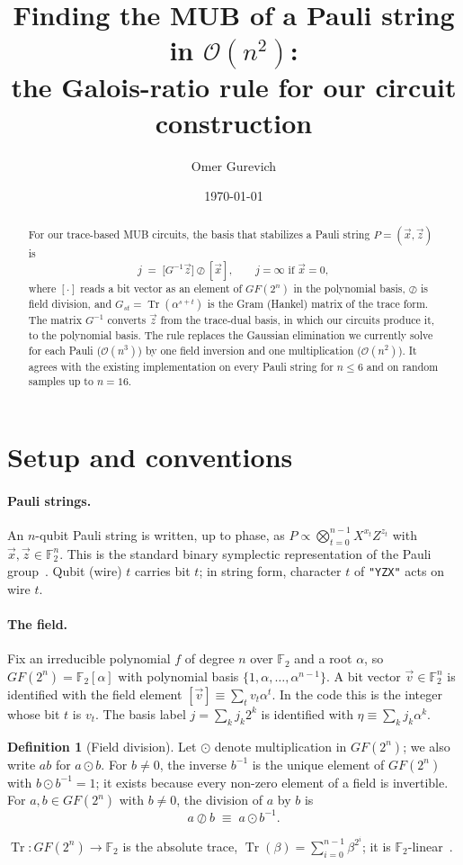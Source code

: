 \documentclass[11pt]{article}
\title{Finding the MUB of a Pauli string in $\mathcal{O}(n^2)$:\\ the Galois-ratio rule for our circuit construction}
\author{Omer Gurevich}
\date{\today}
\theoremstyle{definition}
\newtheorem{definition}{Definition}
\theoremstyle{remark}
\newcommand{\F}{\mathbb{F}}
\newcommand{\Tr}{\operatorname{Tr}}
\newcommand{\vx}{\vec{x}}
\newcommand{\vz}{\vec{z}}
\begin{document}
\maketitle

\begin{abstract}
For our trace-based MUB circuits, the basis that stabilizes a Pauli string $P=(\vx,\vz)$ is
\[
  j \;=\; \bigl[G^{-1}\vz\bigr]\oslash[\vx], \qquad j=\infty \text{ if } \vx=0,
\]
where $[\cdot]$ reads a bit vector as an element of $GF(2^n)$ in the polynomial basis, $\oslash$ is field division, and $G_{st}=\Tr(\alpha^{s+t})$ is the Gram (Hankel) matrix of the trace form.
The matrix $G^{-1}$ converts $\vz$ from the trace-dual basis, in which our circuits produce it, to the polynomial basis.
The rule replaces the Gaussian elimination we currently solve for each Pauli ($\mathcal{O}(n^3)$) by one field inversion and one multiplication ($\mathcal{O}(n^2)$).
It agrees with the existing implementation on every Pauli string for $n\le 6$ and on random samples up to $n=16$.
\end{abstract}

\section{Setup and conventions}

\paragraph{Pauli strings.}
An $n$-qubit Pauli string is written, up to phase, as $P\propto \bigotimes_{t=0}^{n-1} X^{x_t}Z^{z_t}$ with $\vx,\vz\in\F_2^n$.
This is the standard binary symplectic representation of the Pauli group~\cite{Gottesman1997,AaronsonGottesman2004}. Qubit (wire) $t$ carries bit $t$; in string form, character $t$ of \texttt{"YZX"} acts on wire $t$.

\paragraph{The field.}
Fix an irreducible polynomial $f$ of degree $n$ over $\F_2$ and a root $\alpha$, so $GF(2^n)=\F_2[\alpha]$ with polynomial basis $\{1,\alpha,\dots,\alpha^{n-1}\}$.
A bit vector $\vec v\in\F_2^n$ is identified with the field element $[\vec v]\equiv\sum_t v_t\alpha^t$.
In the code this is the integer whose bit $t$ is $v_t$.
The basis label $j=\sum_k j_k2^k$ is identified with $\eta\equiv\sum_k j_k\alpha^k$.

\begin{definition}[Field division]\label{def:division}
Let $\odot$ denote multiplication in $GF(2^n)$; we also write $ab$ for $a\odot b$.
For $b\neq 0$, the inverse $b^{-1}$ is the unique element of $GF(2^n)$ with $b\odot b^{-1}=1$; it exists because every non-zero element of a field is invertible.
For $a,b\in GF(2^n)$ with $b\neq 0$, the division of $a$ by $b$ is
\[
  a\oslash b\;\equiv\;a\odot b^{-1}.
\]
\end{definition}
$\Tr:GF(2^n)\to\F_2$ is the absolute trace, $\Tr(\beta)=\sum_{i=0}^{n-1}\beta^{2^i}$; it is $\F_2$-linear~\cite[Ch.~2]{lidl1997finite}.
\end{document}
